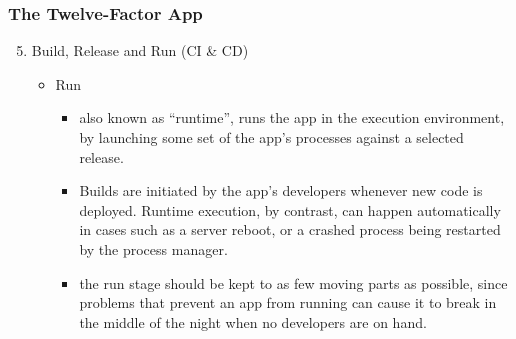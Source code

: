 \documentclass{beamer}
\begin{document}
		\begin{frame}
		\frametitle{The Twelve-Factor App}
			\begin{enumerate}
				\setcounter{enumi}{4}
				\item Build, Release and Run (CI \& CD) \\
				\vspace{2mm}
				\begin{itemize}
					\item {Run}
					\begin{itemize}
						\item<1-> \scriptsize {also known as “runtime”, runs the app in the execution environment, by launching some set of the app’s processes against a selected release}.\vspace{2mm}
						
						\item<2-> \scriptsize {Builds are initiated by the app’s developers whenever new code is deployed. Runtime execution, by contrast, can happen automatically in cases such as a server reboot, or a crashed process being restarted by the process manager}. \vspace{2mm}
						
						\item<3-> \scriptsize {the run stage should be kept to as few moving parts as possible, since problems that prevent an app from running can cause it to break in the middle of the night when no developers are on hand.}
					\end{itemize}
				\end{itemize}
			\end{enumerate}
		\end{frame}

	
\end{document}
